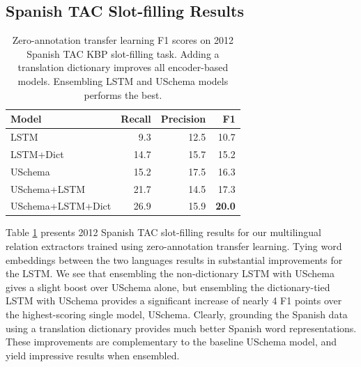\subsection{Spanish TAC Slot-filling Results \label{sec:qual-anal}}

\begin{table}
\begin{center}
\begin{tabular}{|lrrr|}
\hline
\bf Model & \bf Recall & \bf Precision & \bf F1 \\
\hline\hline
LSTM 		      &  9.3 & 12.5   & 10.7   \\
LSTM+Dict	      &  14.7 & 15.7  & 15.2   \\
USchema           &  15.2 & 17.5  & 16.3  \\
\hline\hline
USchema+LSTM       & 21.7 & 14.5  & 17.3  \\
USchema+LSTM+Dict  & 26.9 & 15.9  & \bf 20.0 \\
\hline
\end{tabular}
\caption{Zero-annotation transfer learning F1 scores on 2012 Spanish TAC KBP slot-filling task. Adding a translation dictionary improves all encoder-based models. Ensembling LSTM and USchema models performs the best. \label{es-tac-table}}
\end{center}
\vspace{-.6cm}
\end{table}


Table \ref{es-tac-table} presents 2012 Spanish TAC slot-filling results for our multilingual relation extractors trained using zero-annotation transfer learning. Tying word embeddings between the two languages results in substantial improvements for the LSTM. We see that ensembling the non-dictionary LSTM with USchema gives a slight boost over USchema alone, but ensembling the dictionary-tied LSTM with USchema provides a significant increase of nearly 4 F1 points over the highest-scoring single model, USchema. Clearly, grounding the Spanish data using a translation dictionary provides much better Spanish word representations. These improvements are complementary to the baseline USchema model, and yield impressive results when ensembled.

